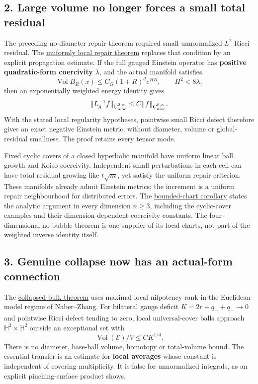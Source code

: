 \documentclass[
  11pt,
]{article}
\begin{document}
\hypertarget{large-volume-no-longer-forces-a-small-total-residual}{%
\subsection{2. Large volume no longer forces a small total
residual}\label{large-volume-no-longer-forces-a-small-total-residual}}

The preceding no-diameter repair theorem required small unnormalized
\(L^2\) Ricci residual. The
\href{20260924_uniformly_local_repair.md}{uniformly local repair
theorem} replaces that condition by an explicit propagation estimate. If
the full gauged Einstein operator has \textbf{positive quadratic-form
coercivity} \(\lambda\), and the actual manifold satisfies \[
 \operatorname{Vol}B_R(x)\le C_G(1+R)^d e^{HR},\qquad H^2<8\lambda,
\] then an exponentially weighted energy identity gives \[
 \|L_g^{-1}f\|_{C^{2,\alpha}_{\rm uloc}}
       \le C\|f\|_{C^{0,\alpha}_{\rm uloc}}.
\] With the stated local regularity hypotheses, pointwise small Ricci
defect therefore gives an exact negative Einstein metric, without
diameter, volume or global-residual smallness. The proof retains every
tensor mode.

Fixed cyclic covers of a closed hyperbolic manifold have uniform linear
ball growth and Koiso coercivity. Independent small perturbations in
each cell can have total residual growing like \(t\sqrt m\), yet satisfy
the uniform repair criterion. These manifolds already admit Einstein
metrics; the increment is a uniform repair neighbourhood for distributed
errors. The
\href{20260924_higher_dimensional_local_repair.md}{bounded-chart
corollary} states the analytic argument in every dimension \(n\ge3\),
including the cyclic-cover examples and their dimension-dependent
coercivity constants. The four-dimensional no-bubble theorem is one
supplier of its local charts, not part of the weighted inverse identity
itself.

\hypertarget{genuine-collapse-now-has-an-actual-form-connection}{%
\subsection{3. Genuine collapse now has an actual-form
connection}\label{genuine-collapse-now-has-an-actual-form-connection}}

The \href{20260924_collapsed_bilateral_bulk.md}{collapsed bulk theorem}
uses maximal local nilpotency rank in the Euclidean-model regime of
Naber--Zhang. For bilateral gauge deficit \(K=2r+q_++q_-\to0\) and
pointwise Ricci defect tending to zero, local universal-cover balls
approach \(\mathbb H^2\times\mathbb H^2\) outside an exceptional set
with \[
                         \operatorname{Vol}(\mathcal E)/V\le CK^{1/4}.
\] There is no diameter, base-ball volume, homotopy or total-volume
bound. The essential transfer is an estimate for \textbf{local averages}
whose constant is independent of covering multiplicity. It is false for
unnormalized integrals, as an explicit pinching-surface product shows.
\end{document}
